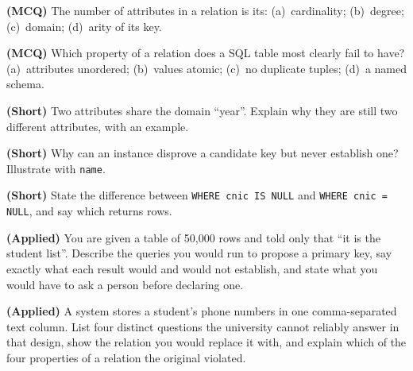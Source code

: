\begin{reviewq}
  \item \textbf{(MCQ)} The number of attributes in a relation is its:
        (a)~cardinality; (b)~degree; (c)~domain; (d)~arity of its key.
  \item \textbf{(MCQ)} Which property of a relation does a SQL table most
        clearly fail to have? (a)~attributes unordered; (b)~values atomic;
        (c)~no duplicate tuples; (d)~a named schema.
  \item \textbf{(Short)} Two attributes share the domain ``year''. Explain why
        they are still two different attributes, with an example.
  \item \textbf{(Short)} Why can an instance disprove a candidate key but never
        establish one? Illustrate with \texttt{name}.
  \item \textbf{(Short)} State the difference between \texttt{WHERE cnic IS
        NULL} and \texttt{WHERE cnic = NULL}, and say which returns rows.
  \item \textbf{(Applied)} You are given a table of 50{,}000 rows and told only
        that ``it is the student list''. Describe the queries you would run to
        propose a primary key, say exactly what each result would and would not
        establish, and state what you would have to ask a person before
        declaring one.
  \item \textbf{(Applied)} A system stores a student's phone numbers in one
        comma-separated text column. List four distinct questions the
        university cannot reliably answer in that design, show the relation you
        would replace it with, and explain which of the four properties of a
        relation the original violated.
\end{reviewq}
